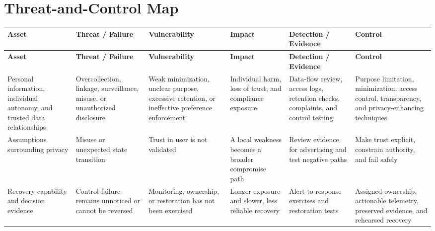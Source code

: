 \documentclass[11pt]{article}
\begin{document}
\section*{Threat-and-Control Map}
\begingroup\scriptsize\setlength{\tabcolsep}{2pt}
\begin{longtable}{>{\RaggedRight\arraybackslash}p{}>{\RaggedRight\arraybackslash}p{}>{\RaggedRight\arraybackslash}p{}>{\RaggedRight\arraybackslash}p{}>{\RaggedRight\arraybackslash}p{}>{\RaggedRight\arraybackslash}p{}}
\toprule\rowcolor{Navy}\color{white}\textbf{Asset} & \color{white}\textbf{Threat / Failure} & \color{white}\textbf{Vulnerability} & \color{white}\textbf{Impact} & \color{white}\textbf{Detection / Evidence} & \color{white}\textbf{Control}\\\midrule
\endfirsthead
\toprule\rowcolor{Navy}\color{white}\textbf{Asset} & \color{white}\textbf{Threat / Failure} & \color{white}\textbf{Vulnerability} & \color{white}\textbf{Impact} & \color{white}\textbf{Detection / Evidence} & \color{white}\textbf{Control}\\\midrule
\endhead
Personal information, individual autonomy, and trusted data relationships & Overcollection, linkage, surveillance, misuse, or unauthorized disclosure & Weak minimization, unclear purpose, excessive retention, or ineffective preference enforcement & Individual harm, loss of trust, and compliance exposure & Data-flow review, access logs, retention checks, complaints, and control testing & Purpose limitation, minimization, access control, transparency, and privacy-enhancing techniques\\\midrule
Assumptions surrounding privacy & Misuse or unexpected state transition & Trust in user is not validated & A local weakness becomes a broader compromise path & Review evidence for advertising and test negative paths & Make trust explicit, constrain authority, and fail safely\\\midrule
Recovery capability and decision evidence & Control failure remains unnoticed or cannot be reversed & Monitoring, ownership, or restoration has not been exercised & Longer exposure and slower, less reliable recovery & Alert-to-response exercises and restoration tests & Assigned ownership, actionable telemetry, preserved evidence, and rehearsed recovery\\\midrule
\bottomrule
\end{longtable}
\endgroup
\end{document}

